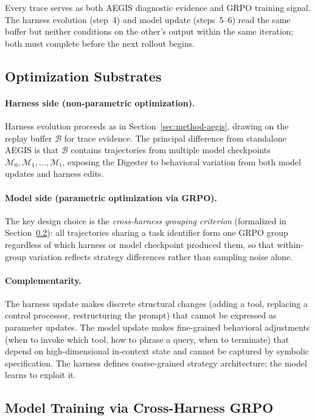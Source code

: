 Every trace serves as both AEGIS diagnostic evidence and GRPO training signal. The harness evolution (step~4) and model update (steps~5--6) read the same buffer but neither conditions on the other's output within the same iteration; both must complete before the next rollout begins.


\subsection{Optimization Substrates}
\label{sec:coevolution-dual-grpo}

\paragraph{Harness side (non-parametric optimization).}
Harness evolution proceeds as in Section~\ref{sec:method-aegis}, drawing on the replay buffer $\mathcal{B}$ for trace evidence. The principal difference from standalone AEGIS is that $\mathcal{B}$ contains trajectories from multiple model checkpoints $\mathcal{M}_0, \mathcal{M}_1, \ldots, \mathcal{M}_t$, exposing the Digester to behavioral variation from both model updates and harness edits.

\paragraph{Model side (parametric optimization via GRPO).}
The key design choice is the \textit{cross-harness grouping criterion} (formalized in Section~\ref{sec:coevolution-grpo}): all trajectories sharing a task identifier form one GRPO group regardless of which harness or model checkpoint produced them, so that within-group variation reflects strategy differences rather than sampling noise alone.

\paragraph{Complementarity.}
The harness update makes discrete structural changes (adding a tool, replacing a control processor, restructuring the prompt) that cannot be expressed as parameter updates. The model update makes fine-grained behavioral adjustments (when to invoke which tool, how to phrase a query, when to terminate) that depend on high-dimensional in-context state and cannot be captured by symbolic specification. The harness defines coarse-grained strategy architecture; the model learns to exploit it.

\subsection{Model Training via Cross-Harness GRPO}
\label{sec:coevolution-grpo}


